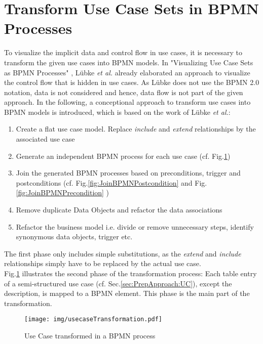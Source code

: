 \section{Transform Use Case Sets in BPMN Processes}
\label{sec:PrepApproach:TransformUCtoBPMN}
To visualize the implicit data and control flow in use cases, it is necessary to transform the given use cases into BPMN models. In "Visualizing Use Case Sets as BPMN Processes" \cite{VisualizeBPMN}, Lübke \textit{et al.} already elaborated an approach to visualize the control flow that is hidden in use cases. As Lübke does not use the BPMN 2.0 notation, data is not considered and hence, data flow is not part of the given approach. In the following, a conceptional approach to transform use cases into BPMN models is introduced, which is based on the work of Lübke \textit{et al.}\cite{VisualizeBPMN}:



\begin{enumerate}
	\item Create a flat use case model. Replace \textit{include} and \textit{extend} relationships by the associated use case
	\item Generate an independent BPMN process for each use case (cf. Fig.\ref{fig:useCaseTransformation})
	\item Join the generated BPMN processes based on preconditions, trigger and postconditions (cf. Fig.\ref{fig:JoinBPMNPostcondition} and Fig.\ref{fig:JoinBPMNPrecondition} )
	\item Remove duplicate Data Objects and refactor the data associations
	\item Refactor the business model i.e. divide or remove unnecessary steps, identify synonymous data objects, trigger etc.
\end{enumerate}


\noindent
The first phase only includes simple substitutions, as the \textit{extend} and \textit{include} relationships simply have to be replaced by the actual use case.\\
Fig.\ref{fig:useCaseTransformation} illustrates the second phase of the transformation process: Each table entry of a semi-structured use case (cf. Sec.\ref{sec:PrepApproach:UC}), except the description, is mapped to a BPMN element. This phase is the main part of the transformation.


\begin{figure}[h!]
	\texttt{[image: img/usecaseTransformation.pdf]}
	\caption{Use Case transformed in a BPMN process}
	\label{fig:useCaseTransformation}
\end{figure}

